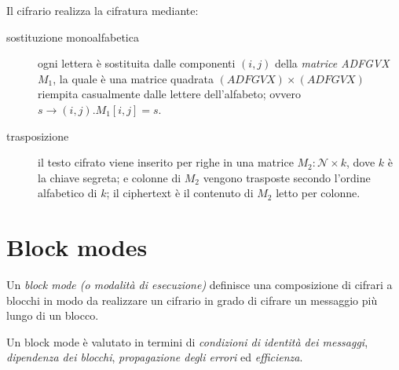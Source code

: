 Il cifrario realizza la cifratura mediante:
\begin{description}
  \item[sostituzione monoalfabetica] ogni lettera è sostituita dalle componenti $(i,j)$ della \textit{matrice ADFGVX} $M_{1}$, la quale è una matrice quadrata $(ADFGVX) \times (ADFGVX)$ riempita casualmente dalle lettere dell'alfabeto; ovvero $s \rightarrow (i,j).M_{1}[i,j]=s$.
  \item[trasposizione] il testo cifrato viene inserito per righe in una matrice $M_{2}:\mathcal{N} \times k$, dove $k$ è la chiave segreta; e colonne di $M_{2}$ vengono trasposte secondo l'ordine alfabetico di $k$; il ciphertext è il contenuto di $M_{2}$ letto per colonne.
\end{description}


\section{Block modes}
Un \textit{block mode (o modalità di esecuzione)} definisce una composizione di cifrari a blocchi in modo da realizzare un cifrario in grado di cifrare un messaggio più lungo di un blocco.

Un block mode è valutato in termini di \textit{condizioni di identità dei messaggi}, \textit{dipendenza dei blocchi}, \textit{propagazione degli errori} ed \textit{efficienza}.

